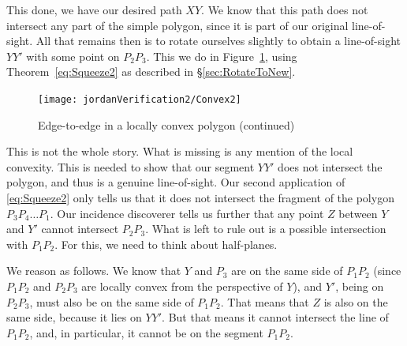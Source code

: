 \linebreak

This done, we have our desired path $XY$. We know that this path does not intersect any part of the simple polygon, since it is part of our original line-of-sight. All that remains then is to rotate ourselves slightly to obtain a line-of-sight $YY'$ with some point on $P_2P_3$. This we do in Figure~\ref{fig:Convex2}, using Theorem~\ref{eq:Squeeze2} as described in \S\ref{sec:RotateToNew}. 

\begin{figure}
\centering\texttt{[image: jordanVerification2/Convex2]}
\caption{Edge-to-edge in a locally convex polygon (continued)}
\label{fig:Convex2}
\end{figure}

This is not the whole story. What is missing is any mention of the local convexity. This is needed to show that our segment $YY'$ does not intersect the polygon, and thus is a genuine line-of-sight. Our second application of \eqref{eq:Squeeze2} only tells us that it does not intersect the fragment of the polygon $P_3P_4\ldots P_1$. Our incidence discoverer tells us further that any point $Z$ between $Y$ and $Y'$ cannot intersect $P_2P_3$. What is left to rule out is a possible intersection with $P_1P_2$. For this, we need to think about half-planes. 

We reason as follows. We know that $Y$ and $P_3$ are on the same side of $P_1P_2$ (since $P_1P_2$ and $P_2P_3$ are locally convex from the perspective of $Y$), and $Y'$, being on $P_2P_3$, must also be on the same side of $P_1P_2$. That means that $Z$ is also on the same side, because it lies on $YY'$. But that means it cannot intersect the line of $P_1P_2$, and, in particular, it cannot be on the segment $P_1P_2$.

